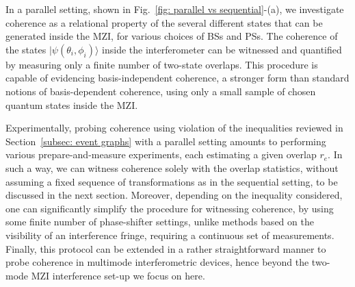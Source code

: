 \documentclass[letterpaper,onecolumn,12pt,accepted=2024-01-17]{article}
\begin{document}
In a parallel setting, shown in Fig.~\ref{fig: parallel vs sequential}-(a), we investigate coherence as a relational property of the several different states that can be generated inside the MZI, for various choices of BSs and PSs.
The coherence of the states $\vert \psi(\theta_i,\phi_i) \rangle $ inside the interferometer can be witnessed and quantified by measuring only a finite number of two-state overlaps. This procedure is capable of evidencing basis-independent coherence, a stronger form than standard notions of basis-dependent coherence, using only a small sample of chosen quantum states inside the MZI. 

{ Experimentally, probing coherence using violation of the inequalities reviewed in Section~\ref{subsec: event graphs} with a parallel setting amounts to performing various prepare-and-measure experiments, each estimating a given overlap $r_e$. In such a way, we can witness coherence solely with the overlap statistics, without assuming a fixed sequence of transformations as in the sequential setting, to be discussed in the next section. Moreover, depending on the inequality considered, one can significantly simplify the procedure for witnessing coherence, by using some finite number of phase-shifter settings, unlike methods based on the visibility of an interference fringe, requiring a continuous set of measurements. Finally, this protocol can be extended in a rather straightforward manner to probe coherence in multimode interferometric devices, hence beyond the two-mode MZI interference set-up we focus on here. %
}
\end{document}

